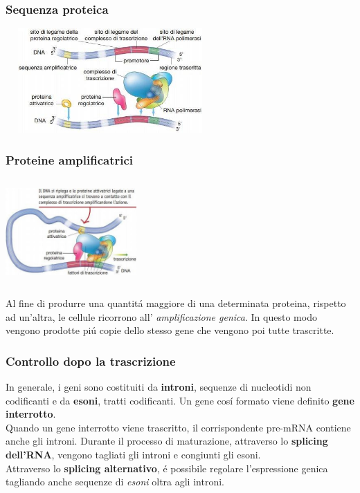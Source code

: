 \documentclass[hyperref={pdfpagelabels=false}]{beamer}
\begin{document}
\begin{frame}\frametitle{Sequenza proteica}
\centering \includegraphics[width=8cm,height=4cm]{sequenzeProteine.jpg}
\end{frame}


\begin{frame}\frametitle{Proteine amplificatrici}
\begin{minipage}[c]{.45\textwidth}
\includegraphics[width=5cm,height=4cm]{proteine.jpg}
\end{minipage}
\begin{minipage}[c]{.5\textwidth}
Al fine di produrre una quantit\'a maggiore di una determinata proteina, rispetto ad un'altra, le cellule ricorrono all' \emph{amplificazione genica}. In questo modo vengono prodotte pi\'u copie dello stesso gene che vengono poi tutte trascritte.
\end{minipage}
\end{frame}


\begin{frame}\frametitle{Controllo dopo la trascrizione}
In generale, i geni sono costituiti da \textbf{introni}, sequenze di nucleotidi non codificanti e da \textbf{esoni}, tratti codificanti. Un gene cos\'i formato viene definito \textbf{gene interrotto}.\\
Quando un gene interrotto viene trascritto, il corrispondente pre-mRNA contiene anche gli introni. Durante il processo di maturazione, attraverso lo \textbf{splicing dell'RNA}, vengono tagliati gli introni e congiunti gli esoni.\\
Attraverso lo \textbf{splicing alternativo}, \'e possibile regolare l'espressione genica tagliando anche sequenze di \emph{esoni} oltra agli introni.
\end{frame}
\end{document}
